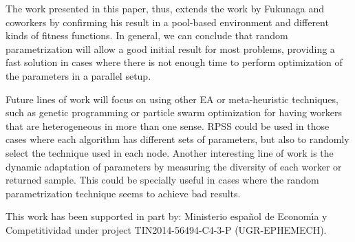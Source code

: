 The work presented in this paper, thus, extends the work by Fukunaga
and coworkers by confirming his result in a pool-based environment and
different kinds of fitness functions. In general, we can conclude that
random parametrization will allow a good initial result for most
problems, providing a fast solution in cases where there is not enough
time to perform optimization of the parameters in a parallel setup. 

Future lines of work will focus on using other EA or meta-heuristic techniques, 
such as genetic programming or particle swarm optimization for having 
workers that are heterogeneous in more than one sense. RPSS could be
used in those cases where each algorithm has different sets of
parameters, but also to randomly select the technique used in each
node. Another interesting line of work is the dynamic adaptation of
parameters by measuring the diversity of each worker or returned
sample. This could be specially useful in cases where the random
parametrization technique seems to achieve bad results. 

\begin{acks}
This work has been supported in part by:  Ministerio espa\~{n}ol de
Econom\'{\i}a y Competitividad under project TIN2014-56494-C4-3-P
(UGR-EPHEMECH).
\end{acks}
